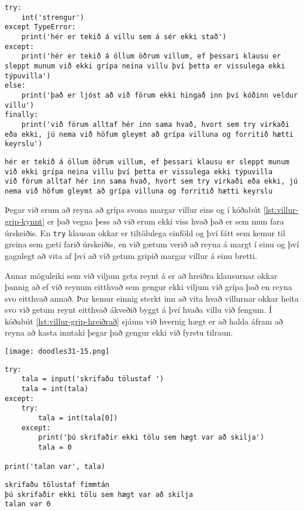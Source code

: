 \begin{lstlisting}[caption=Hvernig á að beita try - except - else, label=lst:villur-grip-kynnt-2]
try:
	int('strengur')
except TypeError:
	print('hér er tekið á villu sem á sér ekki stað')
except:
	print('hér er tekið á öllum öðrum villum, ef þessari klausu er sleppt munum við ekki grípa neina villu því þetta er vissulega ekki týpuvilla')
else:
	print('það er ljóst að við förum ekki hingað inn því kóðinn veldur villu')
finally:
	print('við förum alltaf hér inn sama hvað, hvort sem try virkaði eða ekki, jú nema við höfum gleymt að grípa villuna og forritið hætti keyrslu')
\end{lstlisting}
\lstset{style=uttak}
\begin{lstlisting}
hér er tekið á öllum öðrum villum, ef þessari klausu er sleppt munum við ekki grípa neina villu því þetta er vissulega ekki týpuvilla
við förum alltaf hér inn sama hvað, hvort sem try virkaði eða ekki, jú nema við höfum gleymt að grípa villuna og forritið hætti keyrslu
\end{lstlisting}
\lstset{style=venjulegt}



Þegar við erum að reyna að grípa svona margar villur eins og í kóðabút \ref{lst:villur-grip-kynnt} er það vegna þess að við erum ekki viss hvað það er sem mun fara úrskeiðis.
En \texttt{try} klausan okkar er tiltölulega einföld og því fátt sem kemur til greina sem gæti farið úrskeiðis, en við gætum verið að reyna á margt í einu og því gagnlegt að vita af því að við getum gripið margar villur á einu bretti.


Annar möguleiki sem við viljum geta reynt á er að hreiðra klausurnar okkar þannig að ef við reynum eitthvað sem gengur ekki viljum við grípa það en reyna svo eitthvað annað.
Þar kemur einnig sterkt inn að vita hvað villurnar okkar heita svo við getum reynt eitthvað ákveðið byggt á því hvaða villu við fengum.
Í kóðabút \ref{lst:villur-grip-hreiðrað} sjáum við hvernig hægt er að halda áfram að reyna að kasta inntaki þegar það gengur ekki við fyrstu tilraun.


\begin{center}
	\texttt{[image: doodles31-15.png]}
\end{center}

\begin{lstlisting}[caption=Hvernig má hreiðra try\, except og else, label=lst:villur-grip-hreiðrað]
try:
	tala = input('skrifaðu tölustaf ')
	tala = int(tala)
except:
	try:
		tala = int(tala[0])
	except:
		print('þú skrifaðir ekki tölu sem hægt var að skilja')
		tala = 0

print('talan var', tala)
\end{lstlisting}
\lstset{style=uttak}
\begin{lstlisting}
skrifaðu tölustaf fimmtán
þú skrifaðir ekki tölu sem hægt var að skilja
talan var 0
\end{lstlisting}
\lstset{style=venjulegt}
\phantom{easter egg}

